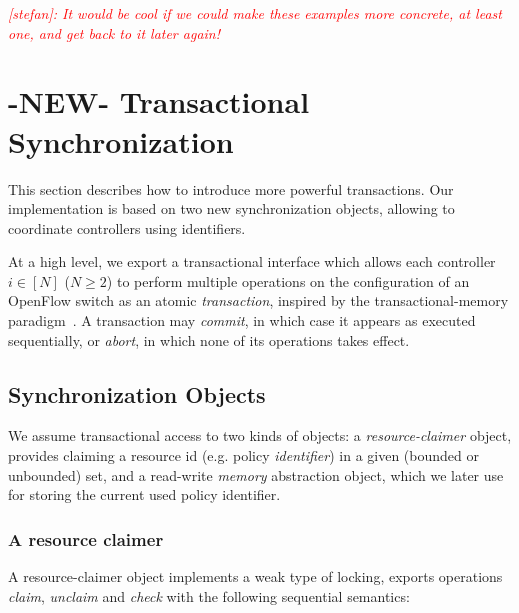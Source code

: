 \documentclass[conference]{sigcomm-alternate}
\newcommand{\claimcheck}{check\xspace}
\newcommand{\stefan}[1]{\textit{\textcolor{red}{[stefan]: #1}}} %
\begin{document}
\stefan{It would be cool if we could make these examples more concrete,
at least one, and get back to it later again!}

\section{-NEW- Transactional Synchronization}\label{sec:main}

This section describes how to introduce more powerful transactions.
Our implementation is based on two new synchronization objects,
allowing to coordinate controllers using identifiers.

At a high level, we export a
transactional interface which allows each controller $i\in[N]$ ($N\geq
2$) to perform multiple
operations on the configuration of an OpenFlow switch as an atomic
\emph{transaction}, inspired by the transactional-memory paradigm~\cite{stm-st95,tm-book}. A transaction may \emph{commit}, in
which case it appears as executed sequentially, or \emph{abort}, in
which none of its operations takes effect.  

\subsection{Synchronization Objects}\label{sec:t-if}

We assume transactional access to  two kinds of objects: a
\emph{resource-claimer} object, provides claiming a resource id (e.g. policy \emph{identifier}) in a
given (bounded or unbounded) set, and a read-write \emph{memory} abstraction
object, which we later use for storing the current used policy identifier.
%
\subsubsection{A resource claimer}
A resource-claimer object implements a weak type of locking, exports operations \emph{claim},
\emph{unclaim} and \emph{\claimcheck} with the following sequential
semantics:
\end{document}
